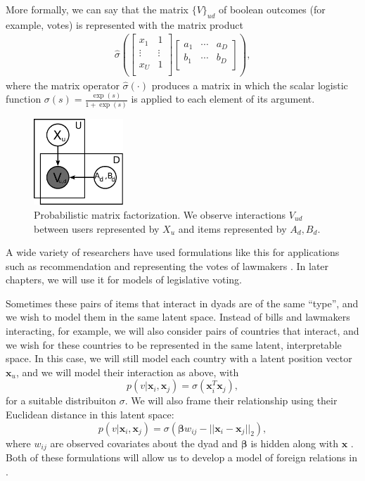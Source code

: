 More formally, we can say that the matrix $\{V\}_{ud}$ of boolean outcomes (for example, votes) is represented with the matrix product
\begin{align}
  \hat \sigma \left( \left[ \begin{array}{cc}
    x_1 & 1 \\
    \vdots & \vdots \\
    x_U & 1 \\
  \end{array}
  \right]
  \left[
    \begin{array}{ccc}
      a_1 & \cdots & a_D \\
      b_1 & \cdots & b_D \\
    \end{array}
    \right]
  \right),
\end{align}
where the matrix operator $\hat \sigma(\cdot)$ produces a matrix in
which the scalar logistic function $\sigma(s) = \frac{\exp(s)}{1 +
  \exp(s)}$ is applied to each element of its argument.

\begin{figure}
  \begin{center}
  \includegraphics[width=0.3\textwidth]{chapter_introductory_material/figs/irt_gm.pdf}
  \end{center}
  \caption{Probabilistic matrix factorization.  We observe
    interactions $V_{ud}$ between users represented by $X_u$ and items
    represented by $A_d, B_d$.}
  \label{fig:irt_gm}
\end{figure}

A wide variety of researchers have used formulations like this for
applications such as recommendation and representing the votes of
lawmakers
\citep{wang:2011,salakhutdinov:2008a,poole:1985,poole:1991,clinton:2004}. In
later chapters, we will use it for models of legislative voting.

Sometimes these pairs of items that interact in dyads are of the same
``type'', and we wish to model them in the same latent space.  Instead
of bills and lawmakers interacting, for example, we will also consider
pairs of countries that interact, and we wish for these countries to
be represented in the same latent, interpretable space.  In this case,
we will still model each country with a latent position vector $\bm
x_u$, and we will model their interaction as above, with
\[
  p(v | \bm x_i, \bm x_j) = \sigma(\bm x_i^T \bm x_j),
\]
for a suitable distribuiton $\sigma$.  We will also frame their
relationship using their Euclidean distance
in this latent space:
\[
  p(v | \bm x_i, \bm x_j) = \sigma(\bm \beta w_{ij} - || \bm x_i - \bm x_j ||_2),
\]
where $w_{ij}$ are observed covariates about the dyad and $\bm \beta$
is hidden along with $\bm x$ \citep{hoff:2002}. Both of these
formulations will allow us to develop a model of foreign relations in
.

